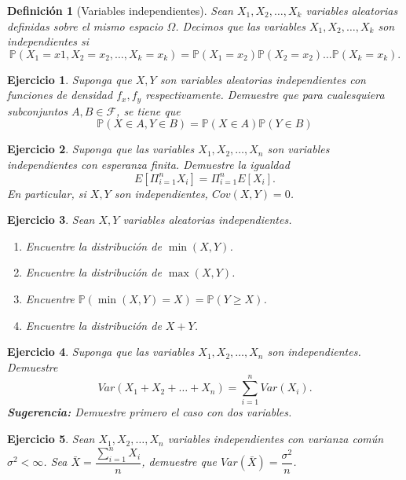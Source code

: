 \documentclass[11pt]{report}
\theoremstyle{break}
\newtheorem{definicion}{Definición}[chapter]
\newtheorem{ejercicio}{Ejercicio}[chapter]
\theoremstyle{break}
\begin{document}
\begin{definicion}[Variables independientes]
Sean $X_1, X_2,\ldots,X_k$ variables aleatorias definidas sobre el mismo espacio $\Omega$. Decimos que las variables $X_1, X_2,\ldots,X_k$ son independientes si
$$
\mathbb{P}(X_1 = x1, X_2 = x_2, \ldots, X_k = x_k) = \mathbb{P}(X_1 = x_2)\mathbb{P}(X_2 = x_2)\ldots\mathbb{P}(X_k = x_k).
$$
\end{definicion}

\begin{ejercicio}
Suponga que $X,Y$ son variables aleatorias independientes con funciones de densidad $f_x, f_y$ respectivamente. Demuestre que para cualesquiera subconjuntos $A,B \in \mathcal{F}$, se tiene que
$$
\mathbb{P}(X \in A, Y \in B) = \mathbb{P}(X \in A)\mathbb{P}(Y \in B)
$$
\end{ejercicio}

\begin{ejercicio}
Suponga que las variables $X_1, X_2, \ldots, X_n$ son variables independientes con esperanza finita. Demuestre la igualdad
$$
E[\Pi_{i=1}^{n}X_i] = \Pi_{i=1}^{n}E[X_i].
$$
En particular, si $X,Y$ son independientes, $Cov(X,Y) = 0$.
\end{ejercicio}

\begin{ejercicio}
Sean $X,Y$ variables aleatorias independientes.
\begin{enumerate}[label=\alph*)]
\item Encuentre la distribución de $\min(X,Y)$.
\item Encuentre la distribución de $\max(X,Y)$.
\item Encuentre $\mathbb{P}(\min(X,Y) = X) = \mathbb{P}(Y \geq X)$.
\item Encuentre la distribución de $X + Y$.
\end{enumerate}
\end{ejercicio}

\begin{ejercicio}
Suponga que las variables $X_1, X_2, \ldots, X_n$ son independientes. Demuestre
$$
Var(X_1 + X_2 + \ldots + X_n) = \sum_{i=1}^{n}Var(X_i).
$$
\textbf{Sugerencia:} Demuestre primero el caso con dos variables.
\end{ejercicio}

\begin{ejercicio}
Sean $X_1, X_2, \ldots, X_n$ variables independientes con varianza común $\sigma^2 < \infty$. Sea $\bar{X} = \dfrac{\sum_{i=1}^{n} X_i }{n}$, demuestre que $Var(\bar{X}) = \dfrac{\sigma^2}{n}$.
\end{ejercicio}
\end{document}
